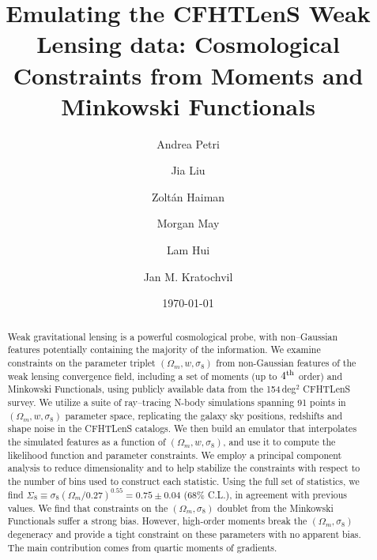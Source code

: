 \documentclass[reprint,aps,prd,superscriptaddress,showkeys,showpacs]{revtex4-1}
\begin{document}
\title{Emulating the CFHTLenS Weak Lensing data:  Cosmological Constraints from Moments and Minkowski Functionals}

\author{Andrea Petri}

\author{Jia Liu}

\author{Zolt\'an Haiman}

\author{Morgan May}

\author{Lam Hui}

\author{Jan M. Kratochvil}

\date{\today}

\label{firstpage}

\begin{abstract}
Weak gravitational lensing is a powerful cosmological probe, with
non--Gaussian features potentially containing the majority of the
information. We examine constraints on the parameter triplet
$(\Omega_m,w,\sigma_8)$ from non-Gaussian features of the weak lensing
convergence field, including a set of moments (up to $4^{\rm th}$
order) and Minkowski Functionals, using publicly available data from
the 154\,deg$^2$ CFHTLenS survey. We utilize a suite of ray--tracing
N-body simulations spanning 91 points in $(\Omega_m,w,\sigma_8)$
parameter space, replicating the galaxy sky positions, redshifts and
shape noise in the CFHTLenS catalogs. We then build an emulator that
interpolates the simulated features as a function of
$(\Omega_m,w,\sigma_8)$, and use it to compute the likelihood function
and parameter constraints. We employ a principal component analysis to
reduce dimensionality and to help stabilize the constraints with
respect to the number of bins used to construct each statistic. Using
the full set of statistics, we find
$\Sigma_8\equiv\sigma_8(\Omega_m/0.27)^{0.55}=0.75\pm0.04$ (68\%
C.L.), in agreement with previous values. We find that constraints on
the $(\Omega_m,\sigma_8)$ doublet from the Minkowski Functionals
suffer a strong bias. However, high-order moments break the
$(\Omega_m,\sigma_8)$ degeneracy and provide a tight constraint on
these parameters with no apparent bias.  The main contribution comes
from quartic moments of gradients.
\end{abstract}
\end{document}
